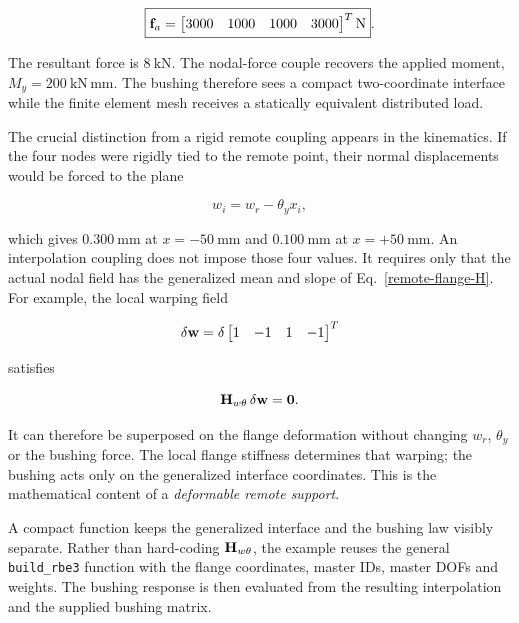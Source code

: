 \begin{equation}
    \boxed{
    \mathbf{f}_a=
    \begin{bmatrix}
        3000&1000&1000&3000
    \end{bmatrix}^{T}\mathrm{N}}.
\end{equation}

The resultant force is $8~\mathrm{kN}$. The nodal-force couple recovers the
applied moment, $M_y=200~\mathrm{kN\,mm}$. The bushing therefore sees a
compact two-coordinate interface while the finite element mesh receives a
statically equivalent distributed load.

The crucial distinction from a rigid remote coupling appears in the kinematics.
If the four nodes were rigidly tied to the remote point, their normal
displacements would be forced to the plane

\begin{equation}
    w_i=w_r-\theta_y x_i,
\end{equation}

which gives $0.300~\mathrm{mm}$ at $x=-50~\mathrm{mm}$ and
$0.100~\mathrm{mm}$ at $x=+50~\mathrm{mm}$. An interpolation coupling does
not impose those four values. It requires only that the actual nodal field has
the generalized mean and slope of Eq.~\eqref{remote-flange-H}. For example,
the local warping field

\begin{equation}
    \delta\mathbf{w}=
    \delta
    \begin{bmatrix}
        1&-1&1&-1
    \end{bmatrix}^{T}
\end{equation}

satisfies

\begin{equation}
    \mathbf{H}_{w\theta}\,\delta\mathbf{w}=\mathbf{0}.
\end{equation}

It can therefore be superposed on the flange deformation without changing
$w_r$, $\theta_y$ or the bushing force. The local flange stiffness determines
that warping; the bushing acts only on the generalized interface coordinates.
This is the mathematical content of a \emph{deformable remote support}.

A compact function keeps the generalized interface and the bushing law visibly
separate. Rather than hard-coding $\mathbf{H}_{w\theta}$, the example reuses the
general \texttt{build\_rbe3} function with the flange coordinates, master IDs,
master DOFs and weights. The bushing response is then evaluated from the
resulting interpolation and the supplied bushing matrix.

